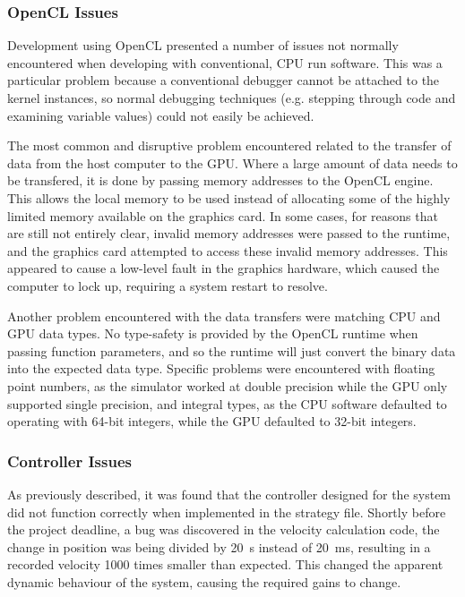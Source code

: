 \documentclass[10pt]{article}
\begin{document}
\subsubsection{OpenCL Issues}

Development using OpenCL presented a number of issues not normally encountered
when developing with conventional, CPU run software.  This was a
particular problem because a conventional debugger cannot be attached to the
kernel instances, so normal debugging techniques (e.g. stepping through code and
examining variable values) could not easily be achieved.

The most common and disruptive problem encountered related to the transfer of
data from the host computer to the GPU.  Where a large amount of data needs
to be transfered, it is done by passing memory addresses to the OpenCL engine. 
This allows the local memory to be used instead of allocating some of the highly
limited memory available on the graphics card.  In some cases, for reasons that
are still not entirely clear, invalid memory addresses were passed to the
runtime, and the graphics card attempted to access these invalid memory
addresses.  This appeared to cause a low-level fault in the graphics hardware,
which caused the computer to lock up, requiring a system restart to resolve.

Another problem encountered with the data transfers were matching CPU and
GPU data types.  No type-safety is provided by the OpenCL runtime when
passing function parameters, and so the runtime will just convert the binary
data into the expected data type.  Specific problems were encountered with
floating point numbers, as the simulator worked at double precision while the
GPU only supported single precision, and integral types, as the CPU
software defaulted to operating with 64-bit integers, while the GPU defaulted to
32-bit integers.

\subsubsection{Controller Issues}

As previously described, it was found that the controller designed for the
system did not function correctly when implemented in the strategy file. 
Shortly before the project deadline, a bug was discovered in the velocity
calculation code, the change in position was being divided by \SI{20}{\second}
instead of \SI{20}{\milli\second}, resulting in a recorded velocity 1000 times
smaller than expected.  This changed the apparent dynamic behaviour of the
system, causing the required gains to change.
\end{document}
